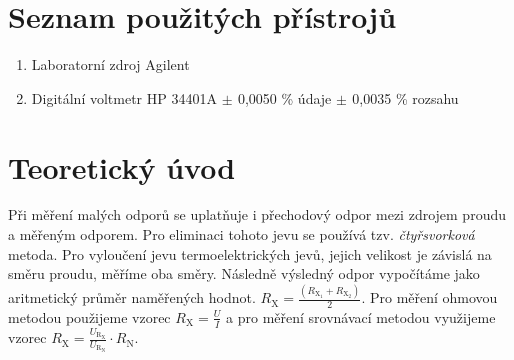 \documentclass[a4paper,12pt]{article}   %
\newcommand{\tsub}[1]{$_\textrm{#1}$}
\newcommand{\var}[2]{$#1_\text{#2}$}
\newcommand{\sub}[1]{_{\text{#1}}}
\newcommand{\rxi}{R\sub{X\tsub{1}}}
\newcommand{\rxii}{R\sub{X\tsub{2}}}
\newcommand{\rx}{R\sub{X}}
\newcommand{\rn}{R\sub{N}}
\newcommand{\urx}{U\sub{R\tsub{X}}}
\newcommand{\urn}{U\sub{R\tsub{N}}}
\begin{document}
\section{Seznam použitých přístrojů}
\label{chap:seznam_pristroju}
\begin{enumerate}
  \item Laboratorní zdroj Agilent
  \item Digitální voltmetr HP 34401A \var{\pm}{} 0,0050 \% údaje \var{\pm}{} 0,0035 \% rozsahu
\end{enumerate}




\section{Teoretický úvod}
\label{chap:teoreticky_uvod}
Při měření malých odporů se uplatňuje i přechodový odpor mezi zdrojem proudu a měřeným odporem. Pro eliminaci tohoto jevu se používá tzv. \textit{čtyřsvorková} metoda. Pro vyloučení jevu termoelektrických jevů, jejich velikost je závislá na směru proudu, měříme oba směry. Následně výsledný odpor vypočítáme jako aritmetický průměr naměřených hodnot. $\rx=\frac{\left(\rxi+\rxii\right)}{2}$. Pro měření ohmovou metodou použijeme vzorec $\rx=\frac{U}{I}$ a pro měření srovnávací metodou využijeme vzorec $\rx = \frac{\urx}{\urn}\cdot\rn$.
\end{document}
